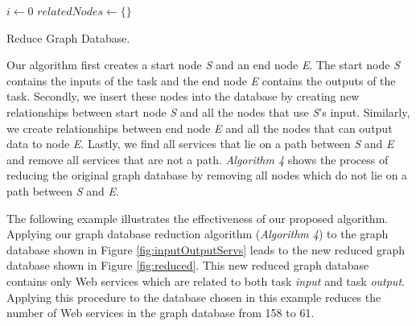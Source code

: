 \begin{algorithm}[H]
 \LinesNumbered
 \SetNlSty{}{}{:}
 $i \leftarrow 0$\;
 $relatedNodes \leftarrow \{\}$\;
 \caption{\footnotesize Reduce Graph Database.}
\label{generation}
\end{algorithm}
\setlength{\textfloatsep}{20pt}%

\par

Our algorithm first creates a start node \emph{S} and an end node \emph{E}. The start node \emph{S} contains the inputs of the task and the end node \emph{E}  contains the outputs of the task. Secondly, we insert these nodes into the database by creating new relationships between start node \emph{S} and all the nodes that use \emph{S}'s input. Similarly, we create relationships between end node \emph{E} and all the nodes that can output data to node \emph{E}. Lastly, we find all services that lie on a path between \emph{S} and \emph{E} and remove all services that are not a path. \emph{Algorithm 4} shows the process of reducing the original graph database by removing all nodes which do not lie on a path between \emph{S} and \emph{E}.

\begin{example}
\noindent
The following example illustrates the effectiveness of our proposed algorithm. Applying our graph database reduction algorithm (\emph{Algorithm 4}) to the graph database shown in Figure \ref{fig:inputOutputServs} leads to the new reduced graph database shown in Figure \ref{fig:reduced}. This new reduced graph database contains only Web services which are related to both task \emph{input} and task \emph{output}. Applying this procedure to the database chosen in this example reduces the number of Web services in the graph database from 158 to 61.
\end{example}

